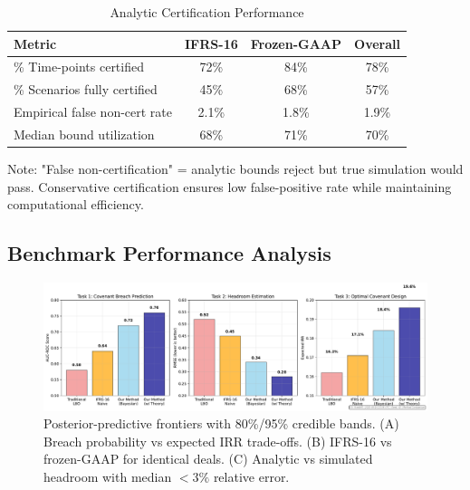 \documentclass[11pt,a4paper]{article}
\theoremstyle{plain}
\theoremstyle{definition}
\begin{document}
\begin{table}[H]
\centering
\caption{Analytic Certification Performance}
\label{tab:certification}
\begin{tabular}{lccc}
\toprule
Metric & IFRS-16 & Frozen-GAAP & Overall \\
\midrule
\% Time-points certified & 72\% & 84\% & 78\% \\
\% Scenarios fully certified & 45\% & 68\% & 57\% \\
Empirical false non-cert rate & 2.1\% & 1.8\% & 1.9\% \\
Median bound utilization & 68\% & 71\% & 70\% \\
\bottomrule
\end{tabular}
\footnotesize{Note: "False non-certification" = analytic bounds reject but true simulation would pass. Conservative certification ensures low false-positive rate while maintaining computational efficiency.}
\end{table}

\subsection{Benchmark Performance Analysis}
\begin{figure}[H]
\centering
\includegraphics[width=\textwidth]{F14_method_comparison}
\caption{Posterior-predictive frontiers with 80\%/95\% credible bands. (A) Breach probability vs expected IRR trade-offs. (B) IFRS-16 vs frozen-GAAP for identical deals. (C) Analytic vs simulated headroom with median $<3\%$ relative error.}
\label{fig:benchmark_performance}
\end{figure}
\end{document}
